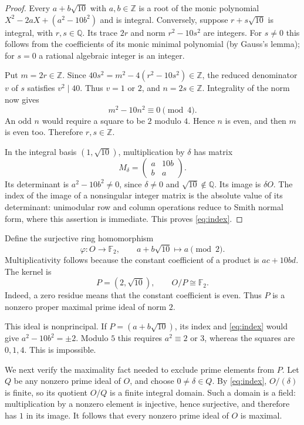 \documentclass[11pt,letterpaper]{article}
\newcommand{\Z}{\mathbb Z}
\newcommand{\Q}{\mathbb Q}
\newcommand{\F}{\mathbb F}
\begin{document}
\begin{proof}
Every $a+b\sqrt{10}$ with $a,b\in\Z$ is a root of the monic polynomial
$X^2-2aX+(a^2-10b^2)$ and is integral. Conversely, suppose
$r+s\sqrt{10}$ is integral, with $r,s\in\Q$. Its trace $2r$ and norm
$r^2-10s^2$ are integers. For $s\ne0$ this follows from the coefficients
of its monic minimal polynomial (by Gauss's lemma); for $s=0$ a rational
algebraic integer is an integer.

Put $m=2r\in\Z$. Since $40s^2=m^2-4(r^2-10s^2)\in\Z$, the reduced
denominator $v$ of $s$ satisfies $v^2\mid40$. Thus $v=1$ or $2$, and
$n=2s\in\Z$. Integrality of the norm now gives
\[
 m^2-10n^2\equiv0\pmod4.
\]
An odd $n$ would require a square to be $2$ modulo $4$. Hence $n$ is
even, and then $m$ is even too. Therefore $r,s\in\Z$.

In the integral basis $(1,\sqrt{10})$, multiplication by $\delta$ has
matrix
\[
 M_\delta=\begin{pmatrix}a&10b\\ b&a\end{pmatrix}.
\]
Its determinant is $a^2-10b^2\ne0$, since $\delta\ne0$ and
$\sqrt{10}\notin\Q$. Its image is $\delta O$. The index of the image
of a nonsingular integer matrix is the absolute value of its determinant:
unimodular row and column operations reduce to Smith normal form, where
this assertion is immediate. This proves \eqref{eq:index}.
\end{proof}

Define the surjective ring homomorphism
\[
 \varphi:O\longrightarrow\F_2,
 \qquad a+b\sqrt{10}\longmapsto a\pmod2.
\]
Multiplicativity follows because the constant coefficient of a product is
$ac+10bd$. The kernel is
\[
 P=(2,\sqrt{10}),
 \qquad O/P\cong\F_2.
\]
Indeed, a zero residue means that the constant coefficient is even.
Thus $P$ is a nonzero proper maximal prime ideal of norm $2$.

This ideal is nonprincipal. If $P=(a+b\sqrt{10})$, its index and
\eqref{eq:index} would give $a^2-10b^2=\pm2$. Modulo $5$ this requires
$a^2\equiv2$ or $3$, whereas the squares are $0,1,4$. This is impossible.

We next verify the maximality fact needed to exclude prime elements from
$P$. Let $Q$ be any nonzero prime ideal of $O$, and choose
$0\ne\delta\in Q$. By \eqref{eq:index}, $O/(\delta)$ is finite, so its
quotient $O/Q$ is a finite integral domain. Such a domain is a field:
multiplication by a nonzero element is injective, hence surjective, and
therefore has $1$ in its image. It follows that every nonzero prime ideal
of $O$ is maximal.
\end{document}

